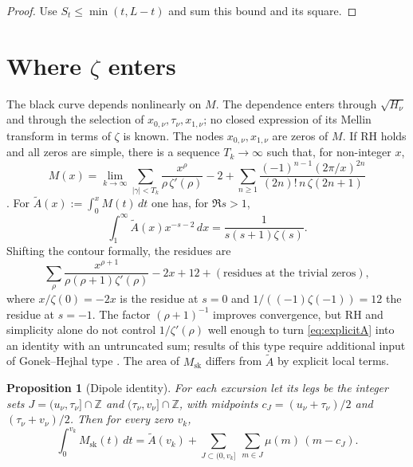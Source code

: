 \documentclass[11pt]{amsart}
\numberwithin{equation}{section}
\theoremstyle{plain}
\newtheorem{proposition}[theorem]{Proposition}
\theoremstyle{definition}
\theoremstyle{remark}
\newcommand{\Msk}{M_{\mathrm{sk}}}
\begin{document}
\begin{proof}
Use $S_t\le\min(t,L-t)$ and sum this bound and its square.
\end{proof}

\section{Where \texorpdfstring{$\zeta$}{zeta} enters}
\label{sec:zeta}

The black curve depends nonlinearly on $M$. The dependence enters through
$\sqrt{H_\nu}$ and through the selection of
$x_{0,\nu},\tau_\nu,x_{1,\nu}$; no closed expression of its Mellin transform
in terms of $\zeta$ is known. The nodes
$x_{0,\nu},x_{1,\nu}$ are zeros of $M$. If RH holds and all zeros are
simple, there is a sequence $T_k\to\infty$ such that, for non-integer $x$,
\begin{equation}
\label{eq:explicitM}
  M(x)=\lim_{k\to\infty}\sum_{|\gamma|<T_k}\frac{x^\rho}{\rho\,\zeta'(\rho)}-2
  +\sum_{n\ge1}\frac{(-1)^{n-1}(2\pi/x)^{2n}}{(2n)!\,n\,\zeta(2n+1)}
\end{equation}
\cite[\S14.27]{Titchmarsh1986}. For $\widetilde{A}(x):=\int_0^xM(t)\,dt$ one
has, for $\Re s>1$,
\begin{equation}
\label{eq:mellin_A}
  \int_1^\infty \widetilde{A}(x)x^{-s-2}\,dx=\frac{1}{s(s+1)\zeta(s)}.
\end{equation}
Shifting the contour formally, the residues are
\begin{equation}
\label{eq:explicitA}
  \sum_\rho\frac{x^{\rho+1}}{\rho(\rho+1)\zeta'(\rho)}-2x+12
  +(\text{residues at the trivial zeros}),
\end{equation}
where $x/\zeta(0)=-2x$ is the residue at $s=0$ and
$1/((-1)\zeta(-1))=12$ the residue at $s=-1$. The factor $(\rho+1)^{-1}$
improves convergence, but RH and simplicity alone do not control
$1/\zeta'(\rho)$ well enough to turn \eqref{eq:explicitA} into an identity
with an untruncated sum; results of this type require additional input of
Gonek--Hejhal type \cite{Ng2004}. The area of $\Msk$ differs from
$\widetilde A$ by explicit local terms.

\begin{proposition}[Dipole identity]
\label{prop:dipoles}
For each excursion let its \emph{legs} be the integer sets
$J=(u_\nu,\tau_\nu]\cap\mathbb{Z}$ and
$(\tau_\nu,v_\nu]\cap\mathbb{Z}$, with midpoints $c_J=(u_\nu+\tau_\nu)/2$
and $(\tau_\nu+v_\nu)/2$. Then for every zero $v_k$,
\begin{equation}
\label{eq:dipoles}
  \int_0^{v_k}\Msk(t)\,dt=\widetilde{A}(v_k)
  +\sum_{J\subset(0,v_k]}\ \sum_{m\in J}\mu(m)\,(m-c_J).
\end{equation}
\end{proposition}
\end{document}
